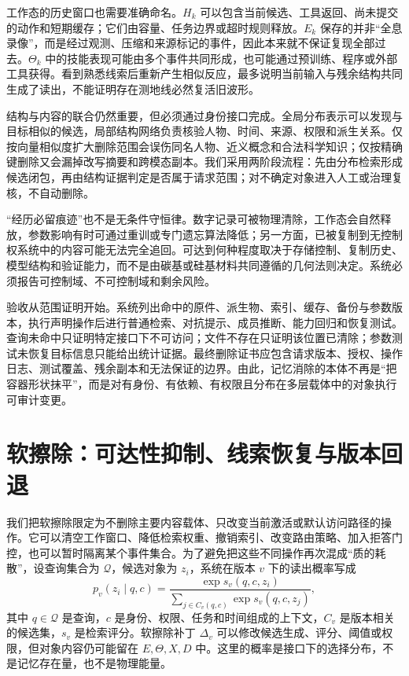 工作态的历史窗口也需要准确命名。$H_k$ 可以包含当前候选、工具返回、尚未提交的动作和短期缓存；它们由容量、任务边界或超时规则释放。$E_k$ 保存的并非“全息录像”，而是经过观测、压缩和来源标记的事件，因此本来就不保证复现全部过去。$\Theta_k$ 中的技能表现可能由多个事件共同形成，也可能通过预训练、程序或外部工具获得。看到熟悉线索后重新产生相似反应，最多说明当前输入与残余结构共同生成了读出，不能证明存在测地线必然复活旧波形。

结构与内容的联合仍然重要，但必须通过身份接口完成。全局分布表示可以发现与目标相似的候选，局部结构网络负责核验人物、时间、来源、权限和派生关系。仅按向量相似度扩大删除范围会误伤同名人物、近义概念和合法科学知识；仅按精确键删除又会漏掉改写摘要和跨模态副本。我们采用两阶段流程：先由分布检索形成候选闭包，再由结构证据判定是否属于请求范围；对不确定对象进入人工或治理复核，不自动删除。

“经历必留痕迹”也不是无条件守恒律。数字记录可被物理清除，工作态会自然释放，参数影响有时可通过重训或专门遗忘算法降低；另一方面，已被复制到无控制权系统中的内容可能无法完全追回。可达到何种程度取决于存储控制、复制历史、模型结构和验证能力，而不是由碳基或硅基材料共同遵循的几何法则决定。系统必须报告可控制域、不可控制域和剩余风险。

验收从范围证明开始。系统列出命中的原件、派生物、索引、缓存、备份与参数版本，执行声明操作后进行普通检索、对抗提示、成员推断、能力回归和恢复测试。查询未命中只证明特定接口下不可访问；文件不存在只证明该位置已清除；参数测试未恢复目标信息只能给出统计证据。最终删除证书应包含请求版本、授权、操作日志、测试覆盖、残余副本和无法保证的边界。由此，记忆消除的本体不再是“把容器形状抹平”，而是对有身份、有依赖、有权限且分布在多层载体中的对象执行可审计变更。

\section{软擦除：可达性抑制、线索恢复与版本回退}
\label{sec:soft_wipe}
我们把软擦除限定为不删除主要内容载体、只改变当前激活或默认访问路径的操作。它可以清空工作窗口、降低检索权重、撤销索引、改变路由策略、加入拒答门控，也可以暂时隔离某个事件集合。为了避免把这些不同操作再次混成“质的耗散”，设查询集合为 $\mathcal Q$，候选对象为 $z_i$，系统在版本 $v$ 下的读出概率写成
\[
p_v(z_i\mid q,c)=
\frac{\exp s_v(q,c,z_i)}
{\sum_{j\in C_v(q,c)}\exp s_v(q,c,z_j)},
\]
其中 $q\in\mathcal Q$ 是查询，$c$ 是身份、权限、任务和时间组成的上下文，$C_v$ 是版本相关的候选集，$s_v$ 是检索评分。软擦除补丁 $\Delta_v$ 可以修改候选生成、评分、阈值或权限，但对象内容仍可能留在 $E,\Theta,X,D$ 中。这里的概率是接口下的选择分布，不是记忆存在量，也不是物理能量。

